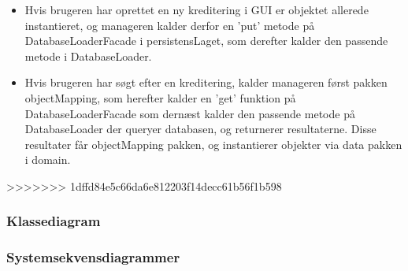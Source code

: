 \begin{itemize}
    \item Hvis brugeren har oprettet en ny kreditering i GUI er objektet allerede instantieret, og manageren kalder derfor en 'put' metode på DatabaseLoaderFacade i persistensLaget, som derefter kalder den passende metode i DatabaseLoader. 
    \item Hvis brugeren har søgt efter en kreditering, kalder manageren først pakken objectMapping, som herefter kalder en 'get' funktion på DatabaseLoaderFacade som dernæst kalder den passende metode på DatabaseLoader der queryer databasen, og returnerer resultaterne. Disse resultater får objectMapping pakken, og instantierer objekter via data pakken i domain.
\end{itemize}



>>>>>>> 1dffd84e5c66da6e812203f14decc61b56f1b598
\subsubsection{Klassediagram}%
\label{ssub:klassediagram}


\subsubsection{Systemsekvensdiagrammer}%
\label{ssub:systemsekvensdiagrammer}


